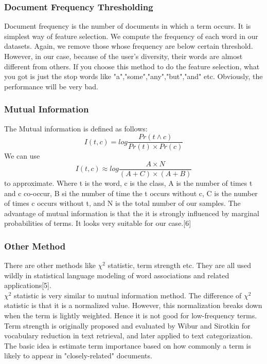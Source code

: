 \documentclass{article}
\begin{document}
  \subsubsection{Document Frequency Thresholding}
	Document frequency is the number of documents in which a term occurs. It is simplest way of feature selection. We compute the frequency of each word in our datasets. Again, we remove those whose frequency are below certain threshold.\\
	However, in our case, because of the user's diversity, their words are almost different from others. If you choose this method to do the feature selection, what you got is just the stop words like "a","some","any","but","and" etc. Obviously, the performance will be very bad.
  \subsubsection{Mutual Information}
    The Mutual information is defined as follows:
  \begin{equation}
  I(t,c)=log\frac{Pr(t\land c)}{Pr(t)\times Pr(c)}
  \end{equation}
  We can use 
  \begin{equation}
  I(t,c)\approx log\frac{A\times N}{(A+C)\times(A+B)}
  \end{equation}
  to approximate. Where t is the word, c is the class, A is the number of times t and c co-occur, B si the number of time the t occurs without c, C is the number of times c occurs without t, and N is the total number of our samples. The advantage of mutual information is that the it is strongly influenced by marginal probabilities of terms. It looks very suitable for our case.[6]
  \subsubsection{Other Method}
  There are other methods like $\chi^2$ statistic, term strength etc. They are all used wildly in statistical language modeling of word associations and related applications[5].\\ $\chi^2$ statistic is very similar to mutual information method. The difference of $\chi^2$ statistic is that it is a normalized value. However, this normalization breaks down when the term is lightly weighted. Hence it is not good for low-frequency terms. Term strength is originally proposed and evaluated by Wibur and Sirotkin for vocabulary reduction in text retrieval, and later applied to text categorization. The basic idea is estimate term importance based on how commonly a term is likely to appear in "closely-related" documents.
\end{document}
